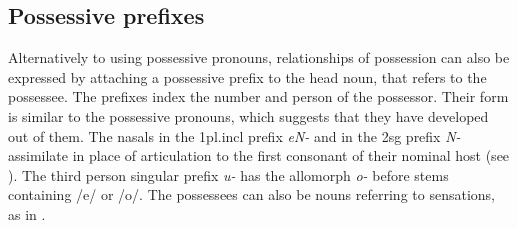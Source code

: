 \begin{table}
\end{table}


\subsection{Possessive prefixes}

Alternatively to using possessive pronouns, relationships of possession can also be expressed by attaching a possessive prefix to the head noun, that refers to the possessee. The prefixes index the number and person of the possessor. Their form is similar to the possessive pronouns, which suggests that they have developed out of them. The nasals in the {\sc 1pl.incl} prefix \emph{eN-} and in the {\sc 2sg} prefix \emph{N-} assimilate in place of articulation to the first consonant of their nominal host (see \Next). The third person singular prefix \emph{u-} has the allomorph \emph{o-} before stems containing /e/ or /o/. The possessees can also be nouns referring to sensations, as in \Next[a]. 

